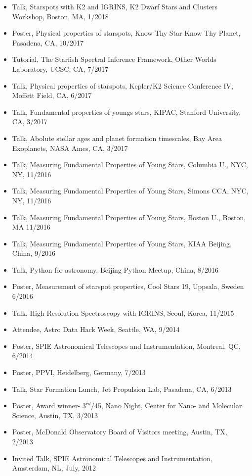 \documentclass[10pt,letterpaper]{article}
\begin{document}
\begin{itemize}
    \item Talk, Starspots with K2 and IGRINS, K2 Dwarf Stars and Clusters Workshop, Boston, MA, 1/2018
    \item Poster, Physical properties of starspots, Know Thy Star Know Thy Planet, Pasadena, CA, 10/2017
    \item Tutorial, The Starfish Spectral Inference Framework, Other Worlds Laboratory, UCSC, CA, 7/2017
    \item Talk, Physical properties of starspots, Kepler/K2 Science Conference IV, Moffett Field, CA, 6/2017
    \item Talk, Fundamental properties of youngs stars, KIPAC, Stanford University, CA, 3/2017
    \item Talk, Abolute stellar ages and planet formation timescales, Bay Area Exoplanets, NASA Ames, CA, 3/2017
    \item Talk, \href{https://speakerdeck.com/gully/measuring-fundamental-properties-of-young-stars}{\faSpeakerDeck} Measuring Fundamental Properties of Young Stars, Columbia U., NYC, NY, 11/2016
    \item Talk, Measuring Fundamental Properties of Young Stars, Simons CCA, NYC, NY, 11/2016
    \item Talk, Measuring Fundamental Properties of Young Stars, Boston U., Boston, MA 11/2016
    \item Talk, Measuring Fundamental Properties of Young Stars, KIAA Beijing, China, 9/2016
    \item Talk, Python for astronomy, Beijing Python Meetup, China, 8/2016
    \item Poster, Measurement of starspot properties, Cool Stars 19, Uppsala, Sweden 6/2016
    \item Talk, High Resolution Spectroscopy with IGRINS, Seoul, Korea, 11/2015
    \item Attendee, Astro Data Hack Week, Seattle, WA, 9/2014
    \item Poster, SPIE Astronomical Telescopes and Instrumentation, Montreal, QC, 6/2014
    \item Poster, PPVI, Heidelberg, Germany, 7/2013
    \item Talk, Star Formation Lunch, Jet Propulsion Lab, Pasadena, CA, 6/2013
    \item Poster, Award winner- $3^{rd}$/45, Nano Night, Center for Nano- and Molecular Science, Austin, TX, 3/2013
    \item Poster, McDonald Observatory Board of Visitors meeting, Austin, TX, 2/2013
    \item Invited Talk, SPIE Astronomical Telescopes and Instrumentation, Amsterdam, NL, July, 2012

\end{itemize}
\end{document}
